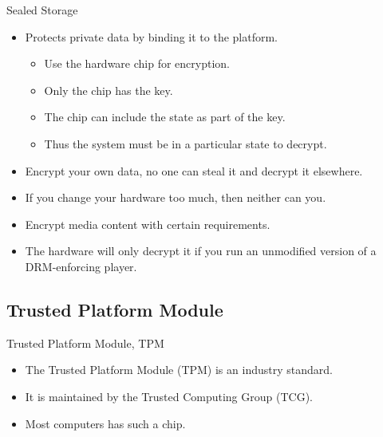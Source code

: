 \begin{frame}
  \begin{block}{Sealed Storage}
    \begin{itemize}
      \item Protects private data by binding it to the platform.
        \begin{itemize}
          \item Use the hardware chip for encryption.
          \item Only the chip has the key.
          \item The chip can include the state as part of the key.
          \item Thus the system must be in a particular state to decrypt.
        \end{itemize}
    \end{itemize}
  \end{block}
\end{frame}

\begin{frame}
  \begin{example}
    \begin{itemize}
      \item Encrypt your own data, no one can steal it and decrypt it 
        elsewhere.
      \item If you change your hardware too much, then neither can you.
    \end{itemize}
  \end{example}

  \pause{}

  \begin{example}
    \begin{itemize}
      \item Encrypt media content with certain requirements.
      \item The hardware will only decrypt it if you run an unmodified version 
        of a DRM-enforcing player.
    \end{itemize}
  \end{example}
\end{frame}

\subsection{Trusted Platform Module}

\begin{frame}
  \begin{block}{Trusted Platform Module, TPM}
    \begin{itemize}
      \item The Trusted Platform Module (TPM) is an industry standard.
      \item It is maintained by the Trusted Computing Group (TCG).
      \item Most computers has such a chip.
    \end{itemize}
  \end{block}
\end{frame}


